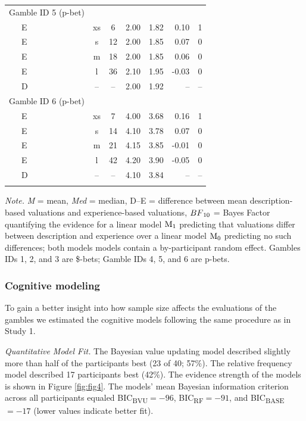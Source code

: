 \documentclass[a4paper, man, floatsintext]{apa6}
\begin{document}
\begin{table}[tbp]
\begin{center}
\begin{threeparttable}
\begin{tabular}{lccccrr}
Gamble ID 5 (p-bet) &  &  &  &  &  & \\
\ \ \ E & xs & 6 & 2.00 & 1.82 & 0.10 & 1\\
\ \ \ E & s & 12 & 2.00 & 1.85 & 0.07 & 0\\
\ \ \ E & m & 18 & 2.00 & 1.85 & 0.06 & 0\\
\ \ \ E & l & 36 & 2.10 & 1.95 & -0.03 & 0\\
\ \ \ D & -- & -- & 2.00 & 1.92 & -- & --\\
Gamble ID 6 (p-bet) &  &  &  &  &  & \\
\ \ \ E & xs & 7 & 4.00 & 3.68 & 0.16 & 1\\
\ \ \ E & s & 14 & 4.10 & 3.78 & 0.07 & 0\\
\ \ \ E & m & 21 & 4.15 & 3.85 & -0.01 & 0\\
\ \ \ E & l & 42 & 4.20 & 3.90 & -0.05 & 0\\
\ \ \ D & -- & -- & 4.10 & 3.84 & -- & --\\
\bottomrule
\addlinespace
\end{tabular}

\begin{tablenotes}[para]
\normalsize{\textit{Note.} \textit{M} = mean, \textit{Med} = median, D--E = difference between mean description-based valuations and experience-based valuations, $BF\textsubscript{10}$ = Bayes Factor quantifying the evidence for a linear model $\mathrm{M}\textsubscript{1}$ predicting that valuations differ between description and experience over a linear model $\mathrm{M}\textsubscript{0}$ predicting no such differences; both models models contain a by-participant random effect. Gambles IDs 1, 2, and 3 are \$-bets; Gamble IDs 4, 5, and 6 are p-bets.}
\end{tablenotes}

\end{threeparttable}
\end{center}

\end{table}

\subsubsection{Cognitive modeling}

To gain a better insight into how sample size affects the evaluations of
the gambles we estimated the cognitive models following the same
procedure as in Study 1.

\textit{Quantitative Model Fit.} The Bayesian value updating model
described slightly more than half of the participants best (23 of 40;
57\%). The relative frequency model described 17 participants best
(42\%). The evidence strength of the models is shown in Figure
\ref{fig:fig4}. The models' mean Bayesian information criterion across
all participants equaled BIC\textsubscript{BVU}\(= -96\),
BIC\textsubscript{RF}\(= -91\), and BIC\textsubscript{BASE}\(= -17\)
(lower values indicate better fit).
\end{document}
